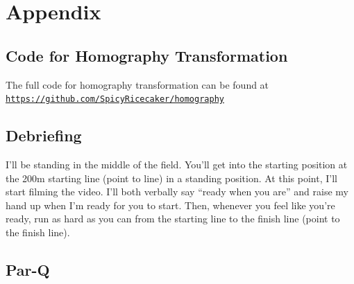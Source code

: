 \documentclass[index]{subfiles}
\begin{document}
\newpage

\raggedright{}
\printbibliography[heading=bibintoc]

\section{Appendix}

\subsection{Code for Homography Transformation}

The full code for homography transformation can be found at \href{https://github.com/SpicyRicecaker/homography}{\nolinkurl{https://github.com/SpicyRicecaker/homography}}

\subsection{Debriefing}
I'll be standing in the middle of the field. You'll get into the starting position at the 200m starting line (point to line) in a standing position. At this point, I'll start filming the video. I'll both verbally say ``ready when you are'' and raise my hand up when I'm ready for you to start. Then, whenever you feel like you're ready, run as hard as you can from the starting line to the finish line (point to the finish line).

\newpage

\subsection{Par-Q}
\end{document}
